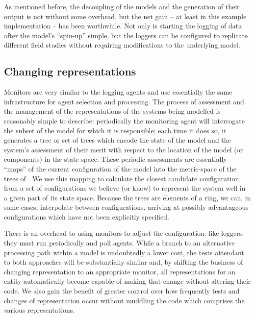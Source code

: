 As mentioned before, the decoupling of the models and the generation
of their output is not without some overhead, but the net gain -- at
least in this example implementation -- has been worthwhile. Not only
is starting the logging of data after the model's ``spin-up'' simple,
but the loggers can be configured to replicate different field studies
without requiring modifications to the underlying model.

\subsection{Changing representations}

Monitors are very similar to the logging agents and use essentially
the same infrastructure for agent selection and processing.  The
process of assessment and the management of the representations of the
systems being modelled is reasonably simple to describe: periodically
the monitoring agent will interrogate the subset of the model for
which it is responsible; each time it does so, it generates a tree or
set of trees which encode the state of the model and the system's
assessment of their merit with respect to the location of the model
(or components) in the state space.  These periodic assessments are
essentially ``maps'' of the current configuration of the model into
the metric-space of the trees of \Cfour.  We use this mapping to
calculate the closest candidate configuration from a set of
configurations we believe (or know) to represent the system well in a
given part of its state space. Because the trees are elements of a
ring, we can, in some cases, interpolate between configurations,
arriving at possibly advantageous configurations which have not been
explicitly specified.

There is an overhead to using monitors to adjust the configuration:
like loggers, they must run periodically and poll agents. While a
branch to an alternative processing path within a model is undoubtedly
a lower cost, the tests attendant to both approaches will be
substantially similar and, by shifting the business of changing
representation to an appropriate monitor, all representations for an
entity automatically become capable of making that change without
altering their code.  We also gain the benefit of greater control over
how frequently tests and changes of representation occur without
muddling the code which comprises the various representations.

